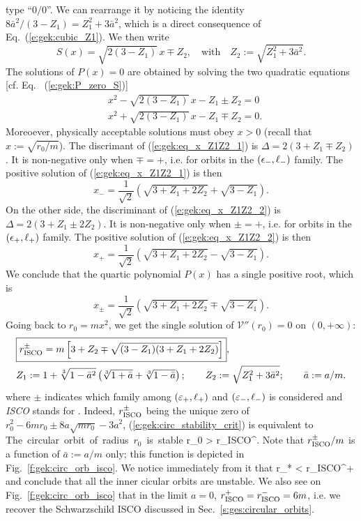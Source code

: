 type ``$0/0$''. We can rearrange it by noticing the identity
${8 \bar{a}^2}/(3 - Z_1) = Z_1^2 + 3 \bar{a}^2$, which is a direct consequence of
Eq.~(\ref{e:gek:cubic_Z1}). We then write
\[
     S(x) = \sqrt{2(3-Z_1)} \, x \mp Z_2,\quad\mbox{with}\quad
    Z_2 := \sqrt{Z_1^2  + 3 \bar{a}^2} .
\]
The solutions of $P(x)=0$ are obtained by solving the two quadratic equations
[cf. Eq.~ (\ref{e:gek:P_zero_S})]
\begin{subequations}
\begin{align}
& x^2 - \sqrt{2(3-Z_1)}\, x - Z_1 \pm Z_2 = 0 \label{e:gek:eq_x_Z1Z2_1} \\
& x^2 + \sqrt{2(3-Z_1)}\, x - Z_1 \mp Z_2 = 0 .  \label{e:gek:eq_x_Z1Z2_2}
\end{align}
\end{subequations}
Moreoever, physically acceptable solutions must obey $x>0$ (recall that
$x := \sqrt{r_0/m}$). The discrimant of (\ref{e:gek:eq_x_Z1Z2_1}) is
$\Delta = 2(3+Z_1\mp Z_2)$. It is non-negative only when $\mp = +$, i.e.
for orbits in the $(\epsilon_-,\ell_-)$ family. The positive solution of (\ref{e:gek:eq_x_Z1Z2_1})
is then
\[
    x_- = \frac{1}{\sqrt{2}} \left( \sqrt{3 + Z_1 + 2 Z_2} + \sqrt{3- Z_1} \right) .
\]
On the other side, the discriminant of (\ref{e:gek:eq_x_Z1Z2_2})
is $\Delta = 2(3+Z_1 \pm 2 Z_2)$. It is non-negative only when $\pm = +$, i.e.
for orbits in the $(\epsilon_+,\ell_+)$ family. The positive solution of (\ref{e:gek:eq_x_Z1Z2_2})
is then
\[
    x_+ = \frac{1}{\sqrt{2}} \left( \sqrt{3 + Z_1 + 2 Z_2} - \sqrt{3- Z_1} \right) .
\]
We conclude that the quartic polynomial $P(x)$ has a single positive root, which
is
\[
    x_\pm = \frac{1}{\sqrt{2}}\left( \sqrt{3 + Z_1 + 2 Z_2} \mp \sqrt{3- Z_1} \right) .
\]
Going back to $r_0 = m x^2$, we get the single solution of $\mathcal{V}''(r_0) = 0$
on $(0, +\infty)$:
\begin{align}
 & \fbox{$\displaystyle r_{\rm ISCO}^\pm = m \left[ 3 + Z_2 \mp \sqrt{(3 - Z_1)(3 + Z_1 + 2 Z_2)} \right] $} ,
    \label{e:gek:r_ISCO} \\
&  Z_1 := 1 + \sqrt[3]{1 - \bar{a}^2} \left( \sqrt[3]{1 + \bar{a}} + \sqrt[3]{1 - \bar{a}} \right) ; \qquad
  Z_2 := \sqrt{Z_1^2  + 3 \bar{a}^2} ; \qquad \bar{a} := a/m .\nonumber
\end{align}
where $\pm$ indicates which family among $(\varepsilon_+,\ell_+)$ and $(\varepsilon_-,\ell_-)$ is
considered and \emph{ISCO} stands for .
Indeed, $r_{\rm ISCO}^\pm $ being the unique zero of $r_0^2 - 6 m r_0 \pm 8 a \sqrt{m r_0} - 3 a^2$,
(\ref{e:gek:circ_stability_crit}) is equivalent to
\be
\mbox{The circular orbit of radius $r_0$ is stable} \quad \iff \quad r_0 > r_{\rm ISCO}^\pm .
\ee
Note that $r_{\rm ISCO}^\pm  / m$ is a function of $\bar{a} := a/m$ only; this
function is depicted in Fig.~\ref{f:gek:circ_orb_isco}. We notice immediately
from it that
\be
    r_* < r_{\rm ISCO}^+
\ee
and conclude that all the inner cicular orbits are unstable.
We also see on Fig.~\ref{f:gek:circ_orb_isco} that in the limit $a=0$,
$r_{\rm ISCO}^+ = r_{\rm ISCO}^- = 6 m$, i.e. we recover the Schwarzschild ISCO
discussed in Sec.~\ref{s:ges:circular_orbits}.

